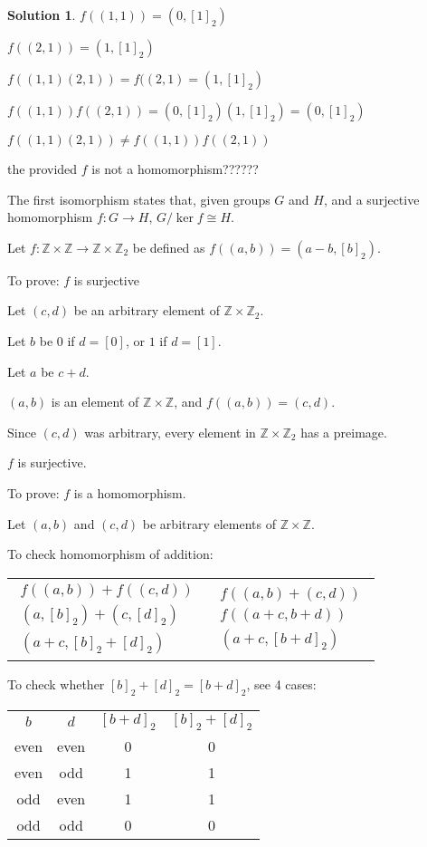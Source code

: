 \documentclass[12pt]{article}
\theoremstyle{definition}
\newtheorem*{soln}{Solution}
\newcommand{\ZZ}{{\mathbb{Z}}}
\renewcommand{\ker}{\operatorname{ker}}
\begin{document}
\begin{soln}\quad

$f((1,1))=(0,[1]_2)$

$f((2,1))=(1,[1]_2)$

$f((1,1)(2,1))=f((2,1)=(1,[1]_2)$

$f((1,1))f((2,1))=(0,[1]_2)(1,[1]_2)=(0,[1]_2)$

$f((1,1)(2,1))\neq f((1,1))f((2,1))$

the provided $f$ is not a homomorphism??????

The first isomorphism states that,
given groups $G$ and $H$,
and a surjective homomorphism $f: G\to H$,
$G/\ker f\cong H$.

Let $f:\ZZ \times \ZZ \to \ZZ \times \ZZ_2$ be defined as
$f ((a, b)) = (a - b, [b]_2)$.

To prove: $f$ is surjective

Let $(c, d)$ be an arbitrary element of $\ZZ\times\ZZ_2$.

Let $b$ be $0$ if $d=[0]$, or $1$ if $d=[1]$.

Let $a$ be $c+d$.

$(a, b)$ is an element of $\ZZ\times\ZZ$, and $f((a,b))=(c,d)$.

Since $(c, d)$ was arbitrary, every element in $\ZZ\times\ZZ_2$ has a preimage.

$f$ is surjective.

To prove: $f$ is a homomorphism.

Let $(a, b)$ and $(c, d)$ be arbitrary elements of $\ZZ\times\ZZ$.

To check homomorphism of addition:

\begin{center}
\begin{tabular}{c|c}
$\begin{gathered}
f((a,b))+f((c,d))\\
(a,[b]_2)+(c,[d]_2)\\
(a+c,[b]_2+[d]_2)
\end{gathered}$
&
$\begin{gathered}
f((a,b)+(c,d))\\
f((a+c,b+d))\\
(a+c,[b+d]_2)
\end{gathered}$
\end{tabular}

To check whether $[b]_2+[d]_2=[b+d]_2$, see 4 cases:

\begin{tabular}{c c c c}
$b$ & $d$ & $[b+d]_2$ & $[b]_2+[d]_2$ \\
even & even & 0 & 0\\
even & odd & 1 & 1\\
odd & even & 1 & 1\\
odd & odd & 0 & 0
\end{tabular}


\end{center}
\end{soln}
\end{document}
